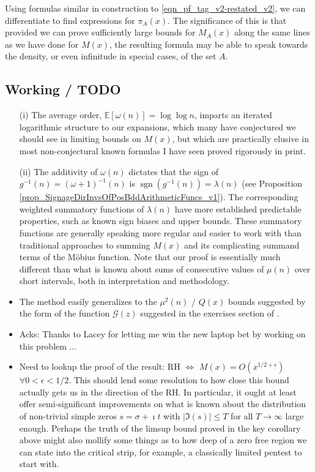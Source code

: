 \documentclass[11pt,reqno,a4letter]{article}
\numberwithin{figure}{section}
\numberwithin{table}{section}
\theoremstyle{plain}
\numberwithin{theorem}{section}
\theoremstyle{definition}
\begin{document}
Using formulas similar in construction to \eqref{eqn_pf_tag_v2-restated_v2}, 
we can differentiate to find expressions for $\pi_A(x)$. The significance of this is that provided we can 
prove sufficiently large bounds for $M_A(x)$ along the same lines as we have done for $M(x)$, the 
resulting formula may be able to speak towards the density, or even infinitude in special cases, 
of the set $A$.

\subsection{Working / TODO} 

\begin{itemize} 
           \item[(i)] The average order, $\mathbb{E}[\omega(n)] = \log\log n$, imparts an iterated logarithmic structure 
           to our expansions, which many have conjectured we should see in limiting bounds on $M(x)$, 
           but which are practically elusive in most non-conjectural known formulas I have seen 
           proved rigorously in print. 
           \item[(ii)] The additivity of $\omega(n)$ dictates that the sign of $g^{-1}(n) = (\omega+1)^{-1}(n)$ 
           is $\operatorname{sgn}(g^{-1}(n)) = \lambda(n)$ 
           (see Proposition \ref{prop_SignageDirInvsOfPosBddArithmeticFuncs_v1}). 
           The corresponding weighted summatory functions of 
           $\lambda(n)$ have more established predictable properties, such as known sign biases and upper bounds. 
           These summatory functions are generally speaking more regular and easier to work with than 
           traditional approaches to summing $M(x)$ 
           and its complicating summand terms of the M\"obius function. 
           Note that our proof is essentially much different than what is known about sums of consecutive values of 
           $\mu(n)$ over short intervals, both in interpretation and methodology. 
           \item The method easily generalizes to the $\mu^2(n)$ / $Q(x)$ bounds suggested by the form of the 
           function $\mathcal{G}(z)$ suggested in the exercises section of \cite{MV}. 
           \item Acks: Thanks to Lacey for letting me win the new laptop bet by working on this problem ... 
           \item Need to lookup the proof of the result: RH $\iff$ $M(x) = O(x^{1/2+\epsilon})$ $\forall 0 < \epsilon < 1/2$. 
           This should lend some resolution to how close this bound actually gets us in the direction of the RH. 
           In particular, it ought at least offer semi-significant improvements on what is known about the 
           distribution of non-trivial simple zeros $s = \sigma + \imath t$ with $|\Im(s)| \leq T$ 
           for all $T \rightarrow \infty$ large enough. 
           Perhaps the truth of the limsup bound proved in the key corollary above might also mollify some things as to 
           how deep of a zero free region we can state into the critical strip, for example, a classically limited 
           pentest to start with. 
\end{itemize}
\end{document}
